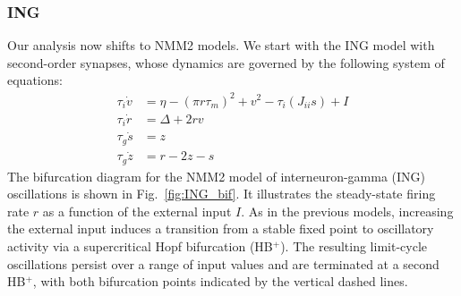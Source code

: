 \subsubsection*{ING}
Our analysis now shifts to NMM2 models. We start with the ING model with second-order synapses, whose dynamics are governed by the following system of equations: 
\begin{equation}
\begin{aligned}
\tau_i \dot{v} &= \eta - \left( \pi r \tau_m \right)^2 + v^2 - \tau_i \left( J_{ii} s \right) + I \\
\tau_i \dot{r} &= \Delta + 2 r v \\
\tau_g \dot{s} &= z \\
\tau_g \dot{z} &= r - 2z - s
\end{aligned}
\end{equation}
The bifurcation diagram for the NMM2 model of interneuron-gamma (ING) oscillations is shown in Fig.~\ref{fig:ING_bif}. It illustrates the steady-state firing rate $r$ as a function of the external input $I$. As in the previous models, increasing the external input induces a transition from a stable fixed point to oscillatory activity via a supercritical Hopf bifurcation (HB$^{+}$). The resulting limit-cycle oscillations persist over a range of input values and are terminated at a second HB$^{+}$, with both bifurcation points indicated by the vertical dashed lines.


